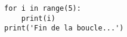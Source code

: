 \documentclass{article}
\begin{document}
\begin{lstlisting}
for i in range(5):
    print(i)
print('Fin de la boucle...')
\end{lstlisting}
\end{document}
